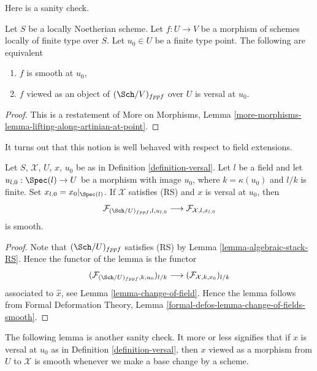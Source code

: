 \noindent
Here is a sanity check.

\begin{lemma}
\label{lemma-versal-implies-smooth}
Let $S$ be a locally Noetherian scheme. Let $f : U \to V$
be a morphism of schemes locally of finite type over $S$.
Let $u_0 \in U$ be a finite type point. The following are equivalent
\begin{enumerate}
\item $f$ is smooth at $u_0$,
\item $f$ viewed as an object of $(\Sch/V)_{fppf}$ over $U$ is
versal at $u_0$.
\end{enumerate}
\end{lemma}

\begin{proof}
This is a restatement of More on Morphisms, Lemma
\ref{more-morphisms-lemma-lifting-along-artinian-at-point}.
\end{proof}

\noindent
It turns out that this notion is well behaved with respect to field
extensions.

\begin{lemma}
\label{lemma-versal-change-of-field}
Let $S$, $\mathcal{X}$, $U$, $x$, $u_0$ be as in
Definition \ref{definition-versal}. Let $l$ be a field and let
$u_{l, 0} : \Spec(l) \to U$ be a morphism with image $u_0$, where
$k = \kappa(u_0)$ and $l/k$ is finite. Set $x_{l, 0} = x_0|_{\Spec(l)}$.
If $\mathcal{X}$ satisfies (RS) and $x$ is versal at $u_0$, then
$$
\mathcal{F}_{(\Sch/U)_{fppf}, l, u_{l, 0}}
\longrightarrow
\mathcal{F}_{\mathcal{X}, l, x_{l, 0}}
$$
is smooth.
\end{lemma}

\begin{proof}
Note that $(\Sch/U)_{fppf}$ satisfies (RS) by
Lemma \ref{lemma-algebraic-stack-RS}.
Hence the functor of the lemma is the functor
$$
(\mathcal{F}_{(\Sch/U)_{fppf}, k , u_0})_{l/k}
\longrightarrow
(\mathcal{F}_{\mathcal{X}, k , x_0})_{l/k}
$$
associated to $\hat x$, see Lemma \ref{lemma-change-of-field}.
Hence the lemma follows from
Formal Deformation Theory, Lemma
\ref{formal-defos-lemma-change-of-fields-smooth}.
\end{proof}

\noindent
The following lemma is another sanity check. It more or less
signifies that if $x$ is versal at $u_0$ as in
Definition \ref{definition-versal},
then $x$ viewed as a morphism from $U$ to $\mathcal{X}$ is
smooth whenever we make a base change by a scheme.


